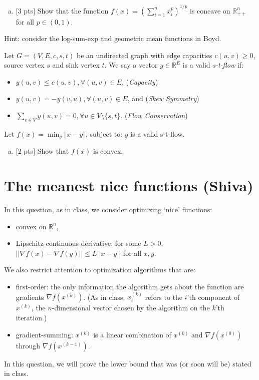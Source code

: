 \documentclass[12pt]{article}
\begin{document}
\begin{enumerate}[(a)]
\item
$[$3 pts$]$  Show that the function $f(x) = \left( \sum_{i=1}^n x_i^p\right)^{1/p}$ is concave on $\mathbb{R}^n_{++}$ for all $p\in(0,1)$.
\end{enumerate}
Hint: consider the log-sum-exp and geometric mean functions in Boyd.

\vspace{.5cm}

\noindent Let $G = (V,E,c,s,t)$ be an undirected graph with edge capacities $c(u,v) \ge 0$, source vertex $s$ and sink vertex $t$.  We say a vector $y\in\mathbb{R}^E$ is a valid {\em s-t-flow} if:
\begin{itemize}
\item $y(u,v) \le c(u,v), \forall (u,v)\in E$, ({\em Capacity})
\item $y(u,v) = -y(v,u), \forall (u,v)\in E$, and ({\em Skew Symmetry})
\item $\sum_{v\in V} y(u,v) = 0, \forall u\in V\setminus\{s,t\}$. ({\em Flow Conservation})
\end{itemize}
Let $f(x) = \min_y \Vert x - y \Vert$, subject to: $y$ is a valid s-t-flow.
\begin{enumerate}[(b)]
\item
$[$2 pts$]$  Show that $f(x)$ is convex.
\end{enumerate}

\newpage
\clearpage


\section{The meanest nice functions (Shiva)}

In this question, as in class, we consider optimizing `nice' functions: \begin{itemize}
\item convex on $\mathbb{R}^n$,
\item Lipschitz-continuous derivative: for some $L > 0$, $||\nabla f(x) - \nabla f(y)|| \leq L ||x - y||$ for all $x,y$.
\end{itemize}
We also restrict attention to optimization algorithms that are:
\begin{itemize}
\item first-order: the only information the algorithm gets about the function are gradients $\nabla f(x^{(k)})$. (As in class, $x^{(k)}_i$ refers to the $i$'th component of $x^{(k)}$, the $n$-dimensional vector chosen by the algorithm on the $k$'th iteration.)
\item gradient-summing: $x^{(k)}$ is a linear combination of $x^{(0)}$ and $\nabla f(x^{(0)})$ through $\nabla f(x^{(k-1)})$. 
\end{itemize}
In this question, we will prove the lower bound that was (or soon will be) stated in class.
\end{document}
